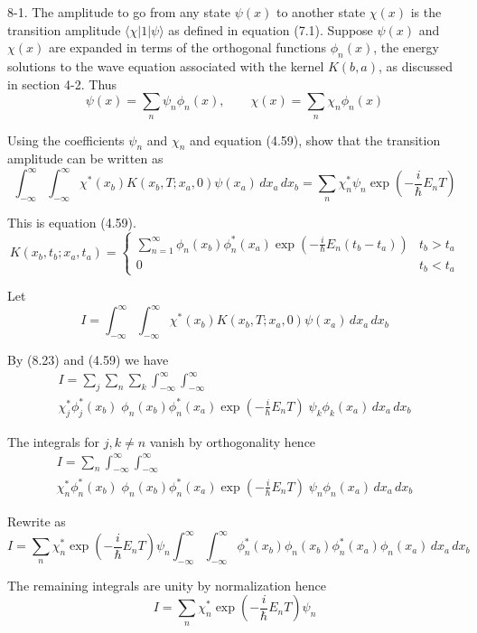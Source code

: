 \documentclass[12pt]{article}
\begin{document}
8-1.
The amplitude to go from any state $\psi(x)$ to another
state $\chi(x)$ is the transition amplitude $\langle\chi|1|\psi\rangle$
as defined in equation (7.1).
Suppose $\psi(x)$ and $\chi(x)$ are expanded in terms of the orthogonal
functions $\phi_n(x)$, the energy solutions to the wave equation associated
with the kernel $K(b,a)$, as discussed in section 4-2. Thus
\begin{equation*}
\psi(x)=\sum_n\psi_n\phi_n(x),\qquad\chi(x)=\sum_n\chi_n\phi_n(x)
\tag{8.23}
\end{equation*}

Using the coefficients $\psi_n$ and $\chi_n$ and equation (4.59),
show that the transition amplitude can be written as
\begin{equation*}
\int_{-\infty}^\infty\int_{-\infty}^\infty
\chi^*(x_b)K(x_b,T;x_a,0)\psi(x_a)\,dx_a\,dx_b
=\sum_n\chi_n^*\psi_n\exp\left(-\frac{i}{\hbar}E_nT\right)
\tag{8.24}
\end{equation*}

This is equation (4.59).
\begin{equation*}
K(x_b,t_b;x_a,t_a)=\begin{cases}
\sum_{n=1}^\infty\phi_n(x_b)\phi_n^*(x_a)
\exp\left(-\frac{i}{\hbar}E_n(t_b-t_a)\right) & t_b>t_a
\\
0 & t_b<t_a
\end{cases}
\tag{4.59}
\end{equation*}

Let
\begin{equation*}
I=\int_{-\infty}^\infty\int_{-\infty}^\infty
\chi^*(x_b)K(x_b,T;x_a,0)\psi(x_a)\,dx_a\,dx_b
\end{equation*}

By (8.23) and (4.59) we have
\begin{multline*}
I=\sum_j\sum_n\sum_k\int_{-\infty}^\infty\int_{-\infty}^\infty
\\
\chi_j^*\phi_j^*(x_b)
\;
\phi_n(x_b)\phi_n^*(x_a)\exp\left(-\frac{i}{\hbar}E_nT\right)
\;
\psi_k\phi_k(x_a)
\,dx_a\,dx_b
\end{multline*}

The integrals for $j,k\ne n$ vanish by orthogonality hence
\begin{multline*}
I=\sum_n\int_{-\infty}^\infty\int_{-\infty}^\infty
\\
\chi_n^*\phi_n^*(x_b)
\;
\phi_n(x_b)\phi_n^*(x_a)\exp\left(-\frac{i}{\hbar}E_nT\right)
\;
\psi_n\phi_n(x_a)
\,dx_a\,dx_b
\end{multline*}

Rewrite as
\begin{equation*}
I=\sum_n\chi_n^*\exp\left(-\frac{i}{\hbar}E_nT\right)\psi_n
\int_{-\infty}^\infty\int_{-\infty}^\infty
\phi_n^*(x_b)\phi_n(x_b)
\phi_n^*(x_a)\phi_n(x_a)
\,dx_a\,dx_b
\end{equation*}

The remaining integrals are unity by normalization hence
\begin{equation*}
I=\sum_n\chi_n^*\exp\left(-\frac{i}{\hbar}E_nT\right)\psi_n
\end{equation*}
\end{document}
